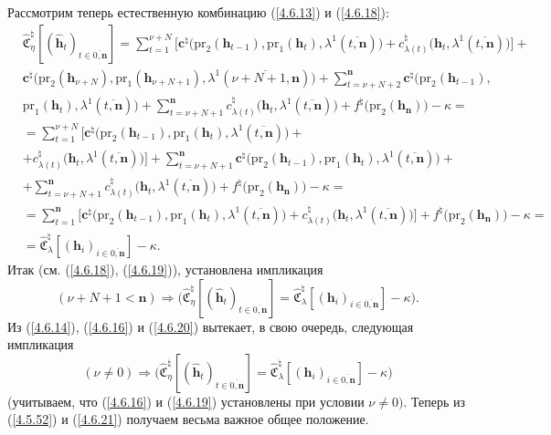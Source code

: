 \documentclass[11pt,twoside]{report}
\newcommand{\bfn}{\begin{equation}}
\newcommand{\efn}{\end{equation}}
\newcommand{\ov}{\overline}
\newcommand{\la}{\lambda}
\newcommand{\zc}{{\mathbf c}}
\newcommand{\nn}{{\mathbf n}}
\begin{document}
{{Рассмотрим теперь естественную комбинацию (\ref{4.6.13}) и (\ref{4.6.18}):
\begin{eqnarray}
&\widehat{\mathfrak{C}}_\eta^\natural[(\hat{\mathbf{h}}_t)_{t\in\ov{0,\nn}}]=
 \sum\limits_{t=1}^{\nu+N}\bigl[\zc^\natural\bigl(\mathrm{pr}_2(\mathbf{h}_{t-1}),\mathrm{pr}_1
 (\mathbf{h}_t), \la^1(\ov{t,\nn})\bigl) + c_{\la(t)}^\natural\bigl(\mathbf{h}_t,\la^1(\ov{t,\nn})\bigl)\bigl] +
&\nonumber\\
&\zc^\natural\bigl(\mathrm{pr}_2(\mathbf{h}_{\nu+N}),
\mathrm{pr}_1(\mathbf{h}_{\nu+N+1}), \la^1(\ov{\nu+N+1,\nn})\bigl)+
\sum\limits_{t=\nu+N+2}^\nn\zc^\natural\bigl(\mathrm{pr}_2(\mathbf{h}_{t-1}),
&\nonumber\\
&\mathrm{pr}_1
(\mathbf{h}_t), \la^1(\ov{t,\nn})\bigl) + \sum\limits_{t=\nu+N+1}^\nn
c_{\la(t)}^\natural\bigl(\mathbf{h}_t,\la^1(\ov{t,\nn})\bigl)
+f^\natural\bigl(\mathrm{pr}_2(\mathbf{h}_\nn)\bigl) - \kappa =
&\nonumber\\
&=\sum\limits_{t=1}^{\nu+N}\bigl[\zc^\natural
(\mathrm{pr}_2(\mathbf{h}_{t-1}),\mathrm{pr}_1(\mathbf{h}_t), \la^1(\ov{t,\nn})\bigl) +
&\nonumber\\
&+c_{\la(t)}^{\natural}\bigl(\mathbf{h}_t,\la^1(\ov{t,\nn})\bigl)\bigl]
+\sum\limits_{t=\nu+N+1}^\nn\zc^\natural\bigl(\mathrm{pr}_2(\mathbf{h}_{t-1}),\mathrm{pr}_1
(\mathbf{h}_t),\la^1(\ov{t,\nn})\bigl) +
&\nonumber\\
&+\sum\limits_{t=\nu+N+1}^\nn c_{\la(t)}^\natural\bigl(\mathbf{h}_t,\la^1(\ov{t,\nn})\bigl)
+f^\natural\bigl(\mathrm{pr}_2(\mathbf{h}_\nn)\bigl) - \kappa  =
&\nonumber\\
&=\sum\limits_{t=1}^\nn \bigl[\zc^\natural\bigl(\mathrm{pr}_2(\mathbf{h}_{t-1}),\mathrm{pr}_1(\mathbf{h}_t),
\la^1(\ov{t,\nn})\bigl) + c_{\la(t)}^\natural(\mathbf{h}_t,\la^1(\ov{t,\nn})\bigl)\bigl] +
f^\natural\bigl(\mathrm{pr}_2(\mathbf{h}_\nn)\bigl) - \kappa=
&\nonumber\\
&= \widehat{\mathfrak{C}}_\la^\natural[(\mathbf{h}_i)_{i\in\ov{0,\nn}}]
 - \kappa.
&\label{4.6.19}
\end{eqnarray}
Итак (см. (\ref{4.6.18}), (\ref{4.6.19})), установлена импликация
\bfn\label{4.6.20}
(\nu+N+1 < \nn)\Longrightarrow \bigl(\widehat{\mathfrak{C}}_\eta^\natural[(\hat{\mathbf{h}}_t)_{t\in\ov{0,\nn}}] =
\widehat{\mathfrak{C}}_\la^\natural[(\mathbf{h}_i)_{i\in\ov{0,\nn}}]  - \kappa\bigl).
\efn
Из (\ref{4.6.14}), (\ref{4.6.16}) и (\ref{4.6.20}) вытекает, в свою очередь, следующая импликация
\bfn\label{4.6.21}(\nu\neq 0) \Longrightarrow
\bigl(\widehat{\mathfrak{C}}_\eta^\natural[(\hat{\mathbf{h}}_t)_{t\in\ov{0,\nn}}] =
\widehat{\mathfrak{C}}_\la^\natural[(\mathbf{h}_i)_{i\in\ov{0,\nn}}]  - \kappa\bigl)
\efn
(учитываем, что (\ref{4.6.16}) и (\ref{4.6.19}) установлены при условии $\nu \neq 0).$
Теперь из (\ref{4.5.52}) и (\ref{4.6.21}) получаем весьма важное общее положение.

}}
\end{document}
